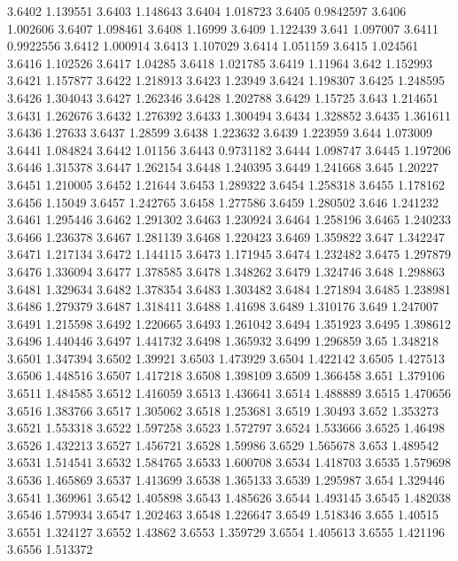 3.6402  1.139551
3.6403  1.148643
3.6404  1.018723
3.6405  0.9842597
3.6406  1.002606
3.6407  1.098461
3.6408  1.16999
3.6409  1.122439
3.641  1.097007
3.6411  0.9922556
3.6412  1.000914
3.6413  1.107029
3.6414  1.051159
3.6415  1.024561
3.6416  1.102526
3.6417  1.04285
3.6418  1.021785
3.6419  1.11964
3.642  1.152993
3.6421  1.157877
3.6422  1.218913
3.6423  1.23949
3.6424  1.198307
3.6425  1.248595
3.6426  1.304043
3.6427  1.262346
3.6428  1.202788
3.6429  1.15725
3.643  1.214651
3.6431  1.262676
3.6432  1.276392
3.6433  1.300494
3.6434  1.328852
3.6435  1.361611
3.6436  1.27633
3.6437  1.28599
3.6438  1.223632
3.6439  1.223959
3.644  1.073009
3.6441  1.084824
3.6442  1.01156
3.6443  0.9731182
3.6444  1.098747
3.6445  1.197206
3.6446  1.315378
3.6447  1.262154
3.6448  1.240395
3.6449  1.241668
3.645  1.20227
3.6451  1.210005
3.6452  1.21644
3.6453  1.289322
3.6454  1.258318
3.6455  1.178162
3.6456  1.15049
3.6457  1.242765
3.6458  1.277586
3.6459  1.280502
3.646  1.241232
3.6461  1.295446
3.6462  1.291302
3.6463  1.230924
3.6464  1.258196
3.6465  1.240233
3.6466  1.236378
3.6467  1.281139
3.6468  1.220423
3.6469  1.359822
3.647  1.342247
3.6471  1.217134
3.6472  1.144115
3.6473  1.171945
3.6474  1.232482
3.6475  1.297879
3.6476  1.336094
3.6477  1.378585
3.6478  1.348262
3.6479  1.324746
3.648  1.298863
3.6481  1.329634
3.6482  1.378354
3.6483  1.303482
3.6484  1.271894
3.6485  1.238981
3.6486  1.279379
3.6487  1.318411
3.6488  1.41698
3.6489  1.310176
3.649  1.247007
3.6491  1.215598
3.6492  1.220665
3.6493  1.261042
3.6494  1.351923
3.6495  1.398612
3.6496  1.440446
3.6497  1.441732
3.6498  1.365932
3.6499  1.296859
3.65  1.348218
3.6501  1.347394
3.6502  1.39921
3.6503  1.473929
3.6504  1.422142
3.6505  1.427513
3.6506  1.448516
3.6507  1.417218
3.6508  1.398109
3.6509  1.366458
3.651  1.379106
3.6511  1.484585
3.6512  1.416059
3.6513  1.436641
3.6514  1.488889
3.6515  1.470656
3.6516  1.383766
3.6517  1.305062
3.6518  1.253681
3.6519  1.30493
3.652  1.353273
3.6521  1.553318
3.6522  1.597258
3.6523  1.572797
3.6524  1.533666
3.6525  1.46498
3.6526  1.432213
3.6527  1.456721
3.6528  1.59986
3.6529  1.565678
3.653  1.489542
3.6531  1.514541
3.6532  1.584765
3.6533  1.600708
3.6534  1.418703
3.6535  1.579698
3.6536  1.465869
3.6537  1.413699
3.6538  1.365133
3.6539  1.295987
3.654  1.329446
3.6541  1.369961
3.6542  1.405898
3.6543  1.485626
3.6544  1.493145
3.6545  1.482038
3.6546  1.579934
3.6547  1.202463
3.6548  1.226647
3.6549  1.518346
3.655  1.40515
3.6551  1.324127
3.6552  1.43862
3.6553  1.359729
3.6554  1.405613
3.6555  1.421196
3.6556  1.513372
